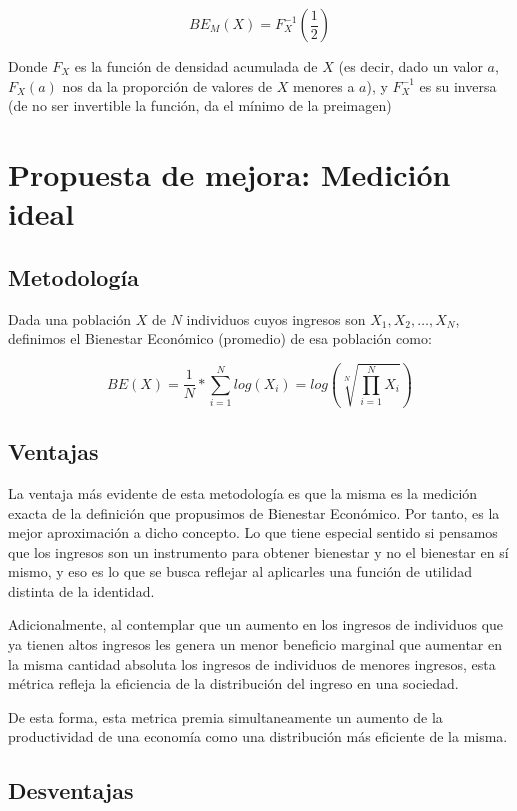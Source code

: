 $$
    BE_M(X) = F_X^{-1}(\frac{1}{2})
$$

Donde $F_X$ es la función de densidad acumulada de $X$ (es decir, dado un valor $a$, $F_X(a)$ nos da la proporción de valores de $X$ menores a $a$), y $F_X^{-1}$ es su inversa (de no ser invertible la función, da el mínimo de la preimagen)

\section{Propuesta de mejora: Medición ideal}

\subsection{Metodología}

Dada una población $X$ de $N$ individuos cuyos ingresos son $X_1, X_2, \dots, X_N$, definimos el Bienestar Económico (promedio) de esa población como:

$$
    BE(X) = \frac{1}{N} * \sum_{i=1}^N log(X_i) = log(\sqrt[N]{\prod_{i=1}^N X_i})
$$

\subsection{Ventajas}

La ventaja más evidente de esta metodología es que la misma es la medición exacta de la definición que propusimos de Bienestar Económico. Por tanto, es la mejor aproximación a dicho concepto. Lo que tiene especial sentido si pensamos que los ingresos son un instrumento para obtener bienestar y no el bienestar en sí mismo, y eso es lo que se busca reflejar al aplicarles una función de utilidad distinta de la identidad.


Adicionalmente, al contemplar que un aumento en los ingresos de individuos que ya tienen altos ingresos les genera un menor beneficio marginal que aumentar en la misma cantidad absoluta los ingresos de individuos de menores ingresos, esta métrica refleja la eficiencia de la distribución del ingreso en una sociedad.

De esta forma, esta metrica premia simultaneamente un aumento de la productividad de una economía como una distribución más eficiente de la misma.

\subsection{Desventajas}

